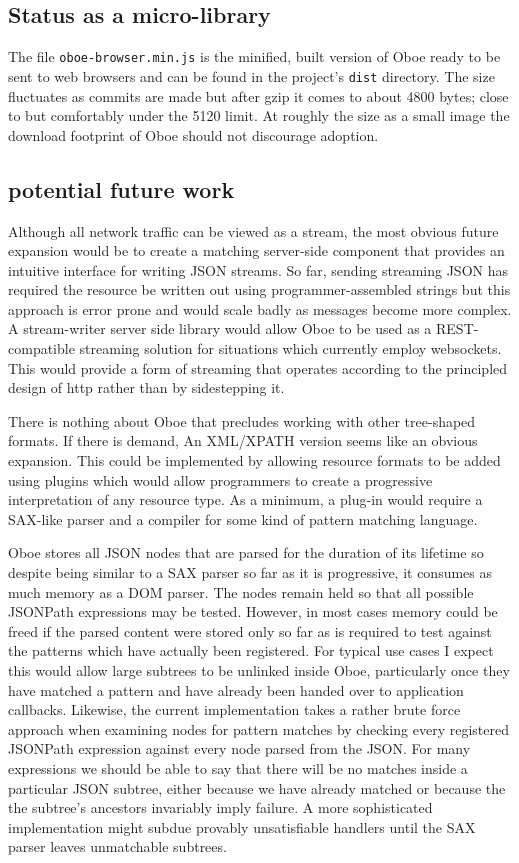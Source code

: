 \documentclass[]{article}
\begin{document}
\subsection{Status as a micro-library}

The file \texttt{oboe-browser.min.js} is the minified, built version of
Oboe ready to be sent to web browsers and can be found in the project's
\texttt{dist} directory. The size fluctuates as commits are made but
after gzip it comes to about 4800 bytes; close to but comfortably under
the 5120 limit. At roughly the size as a small image the download
footprint of Oboe should not discourage adoption.

\subsection{potential future work}

Although all network traffic can be viewed as a stream, the most obvious
future expansion would be to create a matching server-side component
that provides an intuitive interface for writing JSON streams. So far,
sending streaming JSON has required the resource be written out using
programmer-assembled strings but this approach is error prone and would
scale badly as messages become more complex. A stream-writer server side
library would allow Oboe to be used as a REST-compatible streaming
solution for situations which currently employ websockets. This would
provide a form of streaming that operates according to the principled
design of http rather than by sidestepping it.

There is nothing about Oboe that precludes working with other
tree-shaped formats. If there is demand, An XML/XPATH version seems like
an obvious expansion. This could be implemented by allowing resource
formats to be added using plugins which would allow programmers to
create a progressive interpretation of any resource type. As a minimum,
a plug-in would require a SAX-like parser and a compiler for some kind
of pattern matching language.

Oboe stores all JSON nodes that are parsed for the duration of its
lifetime so despite being similar to a SAX parser so far as it is
progressive, it consumes as much memory as a DOM parser. The nodes
remain held so that all possible JSONPath expressions may be tested.
However, in most cases memory could be freed if the parsed content were
stored only so far as is required to test against the patterns which
have actually been registered. For typical use cases I expect this would
allow large subtrees to be unlinked inside Oboe, particularly once they
have matched a pattern and have already been handed over to application
callbacks. Likewise, the current implementation takes a rather brute
force approach when examining nodes for pattern matches by checking
every registered JSONPath expression against every node parsed from the
JSON. For many expressions we should be able to say that there will be
no matches inside a particular JSON subtree, either because we have
already matched or because the the subtree's ancestors invariably imply
failure. A more sophisticated implementation might subdue provably
unsatisfiable handlers until the SAX parser leaves unmatchable subtrees.
\end{document}
